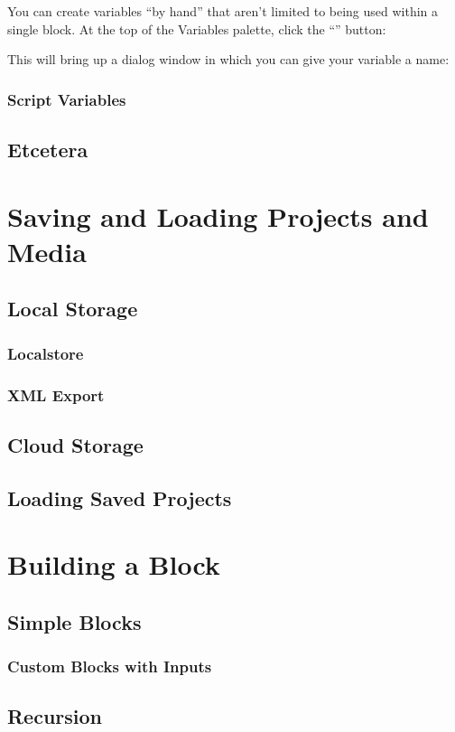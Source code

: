 \documentclass{report}
\begin{document}
You can create variables ``by hand'' that aren't limited to being used within a single block. At the top of the Variables palette, click the ``'' button:


This will bring up a dialog window in which you can give your variable a name:


\subsection{Script Variables}
\section{Etcetera}
\chapter{Saving and Loading Projects and Media}
\section{Local Storage}
\subsection{Localstore}
\subsection{XML Export}
\section{Cloud Storage}
\section{Loading Saved Projects}
\chapter{Building a Block}
\section{Simple Blocks}
\subsection{Custom Blocks with Inputs}
\section{Recursion}
\end{document}
